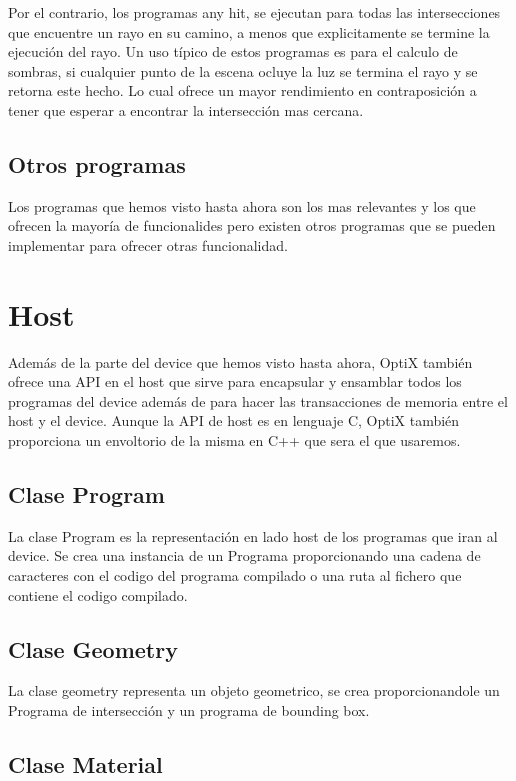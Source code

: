 Por el contrario, los programas any hit, se ejecutan para todas las intersecciones que encuentre un rayo en su camino, a menos que explicitamente se termine la ejecución del rayo.
Un uso típico de estos programas es para el calculo de sombras, si cualquier punto de la escena ocluye la luz se termina el rayo y se retorna este hecho. Lo cual ofrece un mayor rendimiento en contraposición a tener que esperar a encontrar la intersección mas cercana.

\subsection{Otros programas}

Los programas que hemos visto hasta ahora son los mas relevantes y los que ofrecen la mayoría de funcionalides pero existen otros programas que se pueden implementar para ofrecer otras funcionalidad.

\clearpage

\section{Host}

Además de la parte del device que hemos visto hasta ahora, OptiX también ofrece una API en el host que sirve para encapsular y ensamblar todos los programas del device además de para hacer las transacciones de memoria entre el host y el device. Aunque la API de host es en lenguaje C, OptiX también proporciona un envoltorio de la misma en C++ que sera el que usaremos. 

\subsection{Clase Program}

La clase Program es la representación en lado host de los programas que iran al device.
Se crea una instancia de un Programa proporcionando una cadena de caracteres con el codigo del programa compilado o una ruta al fichero que contiene el codigo compilado. 

\subsection{Clase Geometry}

La clase geometry representa un objeto geometrico, se crea proporcionandole un Programa de intersección y un programa de bounding box.

\subsection{Clase Material}

